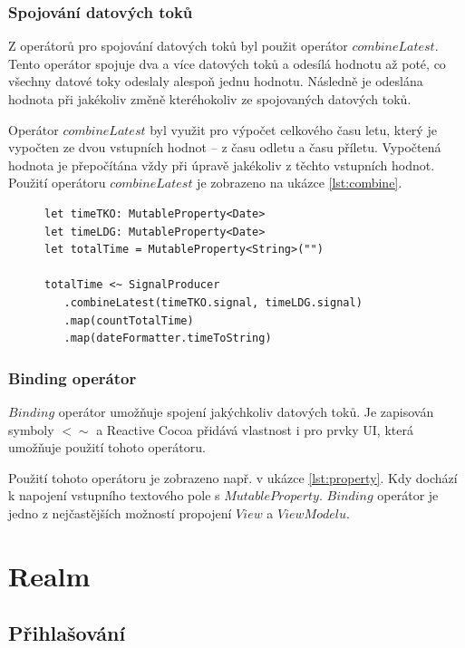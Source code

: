 \documentclass[thesis=M,czech]{FITthesis}[2012/06/26]
\begin{document}
\subsubsection{Spojování datových toků}
Z operátorů pro spojování datových toků byl použit operátor $combineLatest$. Tento operátor spojuje dva a více datových toků a odesílá hodnotu až poté, co všechny datové toky odeslaly alespoň jednu hodnotu. Následně je odeslána hodnota při jakékoliv změně kteréhokoliv ze spojovaných datových toků. \cite{operators}

Operátor $combineLatest$ byl využit pro výpočet celkového času letu, který je vypočten ze dvou vstupních hodnot -- z času odletu a času příletu. Vypočtená hodnota je přepočítána vždy při úpravě jakékoliv z těchto vstupních hodnot. Použití operátoru $combineLatest$ je zobrazeno na ukázce \ref{lst:combine}.

\begin{figure}
\begin{minipage}{\linewidth}
\begin{lstlisting}[caption={Ukázka použití spojení dvou datových toků},label={lst:combine}]
let timeTKO: MutableProperty<Date>
let timeLDG: MutableProperty<Date>
let totalTime = MutableProperty<String>("")

totalTime <~ SignalProducer
   .combineLatest(timeTKO.signal, timeLDG.signal)
   .map(countTotalTime)
   .map(dateFormatter.timeToString)
\end{lstlisting}
\end{minipage}
\end{figure}

\subsubsection{Binding operátor}
$Binding$ operátor umožňuje spojení jakýchkoliv datových toků. Je zapisován symboly $<\sim$  a Reactive Cocoa přidává vlastnost i pro prvky UI, která umožňuje použití tohoto operátoru. \cite{ReactiveCocoa}

Použití tohoto operátoru je zobrazeno např. v ukázce \ref{lst:property}. Kdy dochází k napojení vstupního textového pole s $MutableProperty$. $Binding$ operátor je jedno z nejčastějších možností propojení $View$ a $ViewModelu$.

\section{Realm}

	\subsection{Přihlašování}
	
\end{document}
